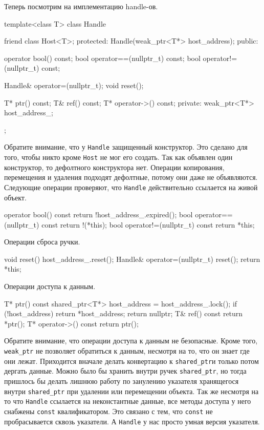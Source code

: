 Теперь посмотрим на имплементацию handle-ов.
\begin{cppcode}
template<class T>
class Handle {
  friend class Host<T>;
protected:
  Handle(weak_ptr<T*> host_address);
public:

  operator bool() const;
  bool operator==(nullptr_t) const;
  bool operator!=(nullptr_t) const;
  
  Handle& operator=(nullptr_t);
  void reset();
    
  T* ptr() const;
  T& ref() const;
  T* operator->() const;
private:
  weak_ptr<T*> host_address_;
};
\end{cppcode}
Обратите внимание, что у \verb"Handle" защищенный конструктор.
Это сделано для того, чтобы никто кроме \verb"Host" не мог его создать.
Так как объявлен один конструктор, то дефолтного конструктора нет.
Операции копирования, перемещения и удаления подходят дефолтные, потому они даже не объявляются.
Следующие операции проверяют, что \verb"Handle" действительно ссылается на живой объект.
\begin{cppcode}
operator bool() const {
  return !host_address_.expired();
}
bool operator==(nullptr_t) const {
  return !(*this);
}
bool operator!=(nullptr_t) const {
  return *this;
}
\end{cppcode}
Операции сброса ручки.
\begin{cppcode}
void reset() {
  host_address_.reset();
}
Handle& operator=(nullptr_t) {
  reset();
  return *this;
}
\end{cppcode}
Операции доступа к данным.
\begin{cppcode}
T* ptr() const {
  shared_ptr<T*> host_address = host_address_.lock();
  if (!host_address)
    return *host_address;
  return nullptr;
}
T& ref() const {
  return *ptr();
}
T* operator->() const {
  return ptr();
}
\end{cppcode}
Обратите внимание, что операции доступа к данным не безопасные.
Кроме того, \verb"weak_ptr" не позволяет обратиться к данным, несмотря на то, что он знает где они лежат.
Приходится вначале делать конвертацию к \verb"shared_ptr"и только потом дергать данные.
Можно было бы хранить внутри ручек \verb"shared_ptr", но тогда пришлось бы делать лишнюю работу по занулению указателя хранящегося внутри \verb"shared_ptr" при удалении или перемещении объекта.
Так же несмотря на то что \verb"Handle"  ссылается на неконстантные данные, все методы доступа у него снабжены \verb"const" квалификатором.
Это связано с тем, что \verb"const" не пробрасывается сквозь указатели.
А \verb"Handle" у нас просто умная версия указателя.

